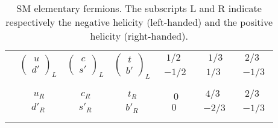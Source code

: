 \begin{table}[]
\begin{tabular}{|cccc|c|c|c|}
& $\begin{pmatrix}\ u\\ d' \end{pmatrix}_L$ & $\begin{pmatrix}\ c\\ s' \end{pmatrix}_L$ & $\begin{pmatrix}\ t\\ b' \end{pmatrix}_L$ & $\begin{matrix}\ 1/2\\ -1/2 \end{matrix}$ & $\begin{matrix}\ 1/3\\ 1/3 \end{matrix}$ & $\begin{matrix}\ 2/3\\ -1/3 \end{matrix}$ \\
                         &                     &                     &                     &                         &                     &                     \\
& $\begin{matrix}\ u_R\\ d'_R \end{matrix}$ & $\begin{matrix}\ c_R\\ s'_R \end{matrix}$ & $\begin{matrix}\ t_R\\ b'_R \end{matrix}$ & $\begin{matrix}\ 0\\ 0 \end{matrix}$ & $\begin{matrix}\ 4/3\\ -2/3 \end{matrix}$ & $\begin{matrix}\ 2/3\\ -1/3 \end{matrix}$ \\
                         &                     &                     &                     &                         &                     &                    \\\hline
\end{tabular}
\caption{SM elementary fermions. The subscripts L and R indicate respectively the negative helicity (left-handed) and the positive helicity (right-handed).}
\label{tab:SMParticles}
\end{table}

